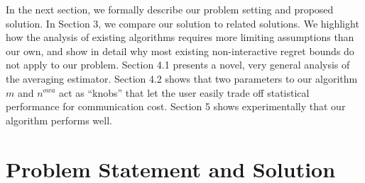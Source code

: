 \documentclass[twoside]{article}
\DeclareMathOperator*{\argmax}{arg\,max}
\newcommand{\nreopt}{n^{\textit{owa}}}
\newcommand{\Y}{\mathcal{Y}}
\newcommand{\X}{\mathcal{X}}
\newcommand{\x}{\mathbf{x}}
\newcommand{\w}{\theta}
\newcommand{\wmle}{\hat\w^{mle}}
\newcommand{\trans}[1]{\ensuremath{{#1}^{\mathsf{T}}}}
\begin{document}
In the next section, we formally describe our problem setting and proposed solution.
In Section 3, we compare our solution to related solutions.
We highlight how the analysis of existing algorithms requires more limiting assumptions than our own,
and show in detail why most existing non-interactive regret bounds do not apply to our problem.
Section 4.1 presents a novel, very general analysis of the averaging estimator.
Section 4.2 shows that two parameters to our algorithm $m$ and $\nreopt$ act as ``knobs'' that let the user easily trade off statistical performance for communication cost.
Section 5 shows experimentally that our algorithm performs well.

\section{Problem Statement and Solution}

\end{document}

